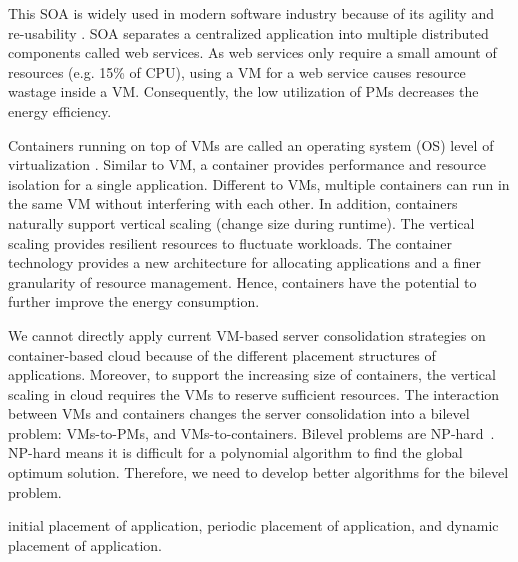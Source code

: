  This SOA is widely used in modern software industry because of its agility and re-usability \cite{Sprott:2004wt}.
SOA separates a centralized application into multiple distributed components called web services. 
As web services only require a small amount of resources (e.g. 15\% of CPU), 
using a VM for a web service causes resource wastage inside a VM. Consequently, the low utilization of PMs decreases
the energy efficiency.


 Containers running on top of 
VMs are called an operating system (OS) level of virtualization \cite{Soltesz:2007cu}. Similar to VM, 
a container provides performance and resource isolation for a single application. 
Different to VMs, multiple containers can run in the same VM without interfering with each other. 
In addition, containers naturally support vertical scaling (change size during runtime)\cite{Vaquero:2011gb}. 
The vertical scaling provides resilient resources to fluctuate workloads. The container technology provides a new 
architecture for allocating applications and a finer granularity of resource management. Hence, containers have the potential to further
improve the energy consumption.



We cannot directly apply current VM-based server consolidation strategies on container-based cloud because 
of the different placement structures of applications. Moreover, to support the increasing size of containers, 
the vertical scaling in cloud requires the VMs to reserve sufficient resources. The interaction between VMs and containers changes 
the server consolidation into a bilevel problem: VMs-to-PMs, and VMs-to-containers. Bilevel problems are NP-hard~\cite{Sinha:2013tn}.  NP-hard means it is difficult for a polynomial algorithm to find the global optimum solution. Therefore, we need to develop better algorithms for the bilevel problem.

initial placement of application, periodic placement of application, and dynamic placement of application.




